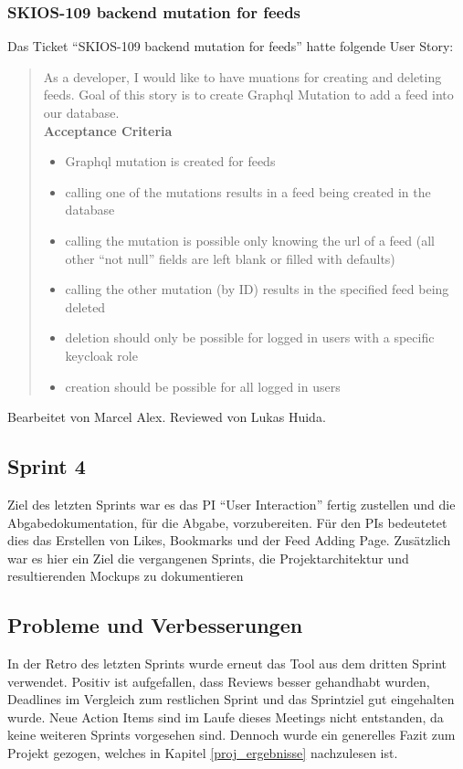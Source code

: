 \subsubsection{SKIOS-109 backend mutation for feeds}
Das Ticket \enquote{SKIOS-109 backend mutation for feeds} hatte folgende User Story:
\begin{quotation}
As a developer, I would like to have muations for creating and deleting feeds.
Goal of this story is to create Graphql Mutation to add a feed into our database. \\
\textbf{Acceptance Criteria}
\begin{itemize}
    \item Graphql mutation is created for feeds
    \item calling one of the mutations results in a feed being created in the database
    \item calling the mutation is possible only knowing the url of a feed (all other “not null” fields are left blank or filled with defaults)
    \item calling the other mutation (by ID) results in the specified feed being deleted
    \item deletion should only be possible for logged in users with a specific keycloak role
    \item creation should be possible for all logged in users
\end{itemize}
\end{quotation}
Bearbeitet von Marcel Alex.
Reviewed von Lukas Huida.

\subsection{Sprint 4}
Ziel des letzten Sprints war es das \ac{PI} \enquote{User Interaction} fertig zustellen und die Abgabedokumentation, für die Abgabe, vorzubereiten.
Für den \acp{PI} bedeutetet dies das Erstellen von Likes, Bookmarks und der Feed Adding Page.
Zusätzlich war es hier ein Ziel die vergangenen Sprints, die Projektarchitektur und resultierenden Mockups zu dokumentieren

\subsection{Probleme und Verbesserungen}
In der Retro des letzten Sprints wurde erneut das Tool aus dem dritten Sprint verwendet.
Positiv ist aufgefallen, dass Reviews besser gehandhabt wurden, Deadlines im Vergleich zum restlichen Sprint und das Sprintziel gut eingehalten wurde.
Neue Action Items sind im Laufe dieses Meetings nicht entstanden, da keine weiteren Sprints vorgesehen sind.
Dennoch wurde ein generelles Fazit zum Projekt gezogen, welches in Kapitel \ref{proj_ergebnisse} nachzulesen ist.


